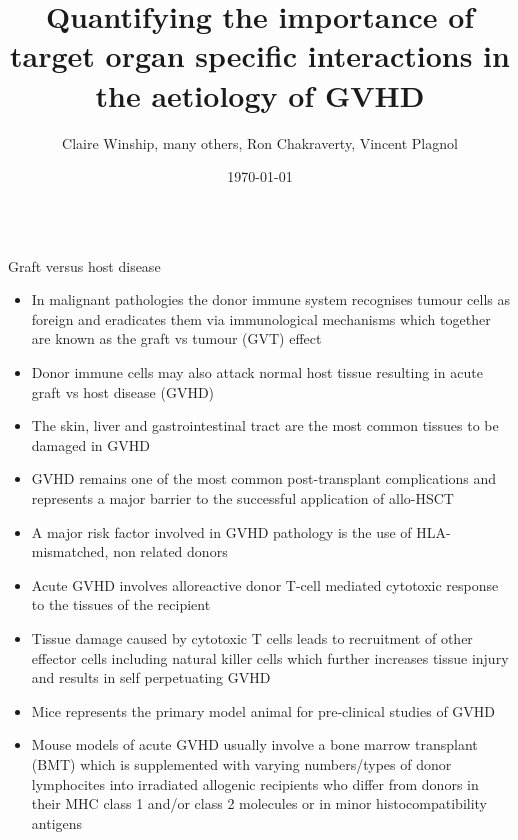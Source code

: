 \documentclass[final,hyperref={pdfpagelabels=false}]{beamer}
\title[GVHD]{Quantifying the importance of target organ specific interactions in the aetiology of GVHD}
\author[Winship \& Plagnol]{Claire Winship, many others, Ron Chakraverty, Vincent Plagnol}
\institute[UGI]{UCL Genetics Institute}
\date{\today}
\begin{document}
  \begin{frame}{} 

  \begin{beamercolorbox}{}
    \maketitle
  \end{beamercolorbox}


    \vfill
    \begin{columns}[t]

      \begin{column}{.25\linewidth}
        \begin{block}{Graft versus host disease}
     \begin{itemize}
          \item In malignant pathologies the donor immune system recognises tumour cells as foreign and eradicates them via immunological mechanisms which together are known as the graft vs tumour (GVT) effect
          \item Donor immune cells may also attack normal host tissue resulting in acute graft vs host disease (GVHD)
          \item The skin, liver and gastrointestinal tract are the most common tissues to be damaged in GVHD
          \item GVHD remains one of the most common post-transplant complications and represents a major barrier to the successful application of allo-HSCT
	  \item A major risk factor involved in GVHD pathology is the use of HLA-mismatched, non related donors
          \item Acute GVHD involves alloreactive donor T-cell mediated cytotoxic response to the tissues of the recipient
          \item Tissue damage caused by cytotoxic T cells leads to recruitment of other effector cells including natural killer cells which further increases tissue injury and results in self perpetuating GVHD
          \item Mice represents the primary model animal for pre-clinical studies of GVHD
          \item Mouse models of acute GVHD usually involve a bone marrow transplant (BMT) which is supplemented with varying numbers/types of donor lymphocites into irradiated allogenic recipients who differ from donors in their MHC class 1 and/or class 2 molecules or in minor histocompatibility antigens
          \end{itemize} 
        \end{block}



\end{column}
\end{columns}
\end{frame}
\end{document}
